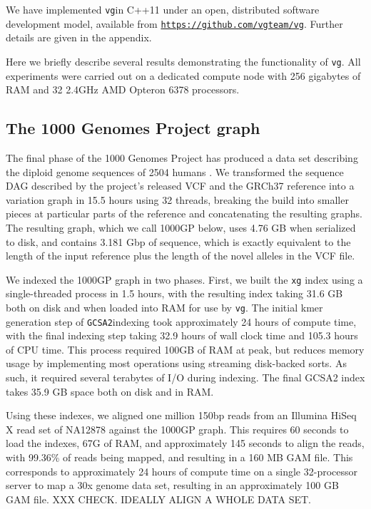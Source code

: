 \documentclass[12pt]{article}
\newcommand{\vg}{{\tt vg}}
\newcommand{\gcsa}{{\tt GCSA2}}
\begin{document}
We have implemented \vg in C++11 under an open, distributed software development model, available from \href{https://github.com/vgteam/vg}{\tt https://github.com/vgteam/vg}.  Further details are given in the appendix.

Here we briefly describe several results demonstrating the functionality of \vg.
All experiments were carried out on a dedicated compute node with 256 gigabytes of RAM and 32 2.4GHz AMD Opteron 6378 processors.

\subsection{The 1000 Genomes Project graph}
\label{sec:1000g}

The final phase of the 1000 Genomes Project has produced a data set describing the diploid genome sequences of 2504 humans \cite{1000g2015}.
We transformed the sequence DAG described by the project's released VCF and the GRCh37 reference into a variation graph in 15.5 hours using 32 threads, breaking the build into smaller pieces at particular parts of the reference and concatenating the resulting graphs.
The resulting graph, which we call 1000GP below, uses 4.76 GB when serialized to disk, and contains 3.181 Gbp of sequence, which is exactly equivalent to the length of the input reference plus the length of the novel alleles in the VCF file.

We indexed the 1000GP graph in two phases.
First, we built the {\tt xg} index using a single-threaded process in 1.5 hours, with the resulting index taking 31.6 GB both on disk and when loaded into RAM for use by \vg.
The initial kmer generation step of  \gcsa indexing took approximately 24 hours of compute time, with the final indexing step taking 32.9 hours of wall clock time and 105.3 hours of CPU time.
This process required 100GB of RAM at peak, but reduces memory usage by implementing most operations using streaming disk-backed sorts.
As such, it required several terabytes of I/O during indexing.
The final GCSA2 index takes 35.9 GB space both on disk and in RAM.

Using these indexes, we aligned one million 150bp reads from an Illumina HiSeq X read set of NA12878 against the 1000GP graph.
This requires 60 seconds to load the indexes, 67G of RAM, and approximately 145 seconds to align the reads, with 99.36\% of reads being mapped, and resulting in a 160 MB
GAM file.  This corresponds to approximately 24 hours of compute time on a single 32-processor server to map a 30x genome data set, resulting in an approximately 100 GB GAM file.  XXX CHECK.  IDEALLY ALIGN A WHOLE DATA SET.
\end{document}
